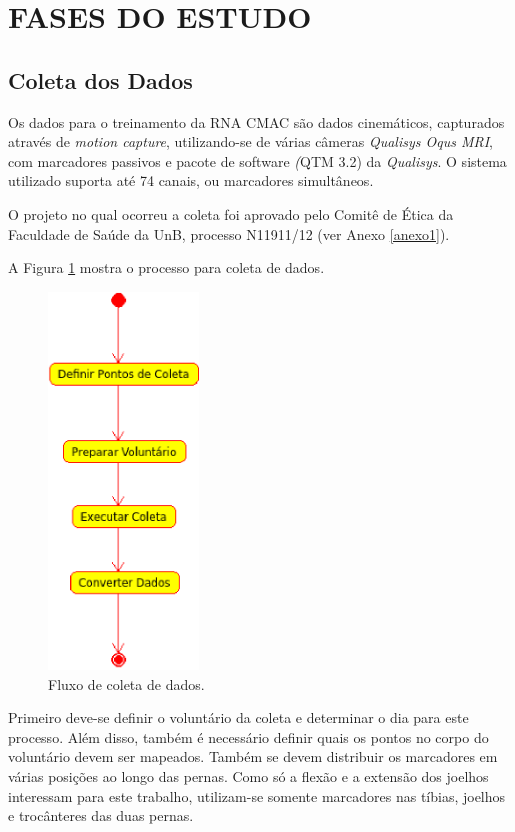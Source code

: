 \section[FASES ESTUDO]{FASES DO ESTUDO}
\subsection[Coleta dos Dados]{\textbf{Coleta dos Dados}}
Os dados para o treinamento da RNA CMAC são dados cinemáticos, capturados através de \emph{motion capture}, utilizando-se de várias câmeras \emph{Qualisys Oqus MRI}, com marcadores passivos e pacote de software \emph(QTM 3.2) da \emph{Qualisys}. 
O sistema utilizado suporta até 74 canais, ou marcadores simultâneos.

O projeto no qual ocorreu a coleta foi aprovado pelo Comitê de Ética da Faculdade de Saúde da UnB, processo N11911/12 (ver Anexo \ref{anexo1}).

A Figura \ref{coleta_dados} mostra o processo para coleta de dados.

\begin{figure}[ht]
 \centering
 \includegraphics[width=4cm]{figuras/coleta_dados.eps}
 \caption{Fluxo de coleta de dados.}
 \label{coleta_dados}
\end{figure}

Primeiro deve-se definir o voluntário da coleta e determinar o dia para este processo. 
Além disso, também é necessário definir quais os pontos no corpo do voluntário devem ser mapeados. 
Também se devem distribuir os marcadores em várias posições ao longo das pernas. 
Como só a flexão e a extensão dos joelhos interessam para este trabalho, utilizam-se somente marcadores nas tíbias, joelhos e trocânteres das duas pernas.

